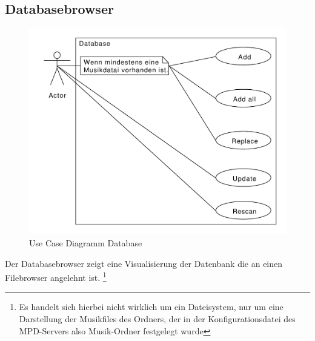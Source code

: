 \subsection{Databasebrowser}
\begin{figure}[htb!]
	\centering
        \includegraphics[width=\textwidth]{uc_database.pdf}
	\caption{Use Case Diagramm Database}
	\label{uc_database}
\end{figure}
Der Databasebrowser zeigt eine Visualisierung der Datenbank die an einen Filebrowser angelehnt ist.
\footnote{Es handelt sich hierbei nicht wirklich um ein Dateisystem, nur um eine Darstellung der Musikfiles des Ordners, der in der Konfigurationsdatei des MPD-Servers also Musik-Ordner festgelegt wurde}
